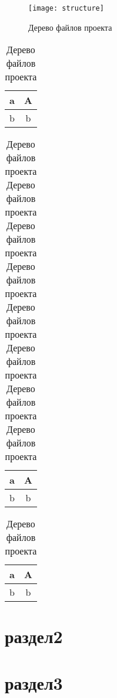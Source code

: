\begin{figure}
\centering
\texttt{[image: structure]}
\caption{Дерево файлов проекта}
\label{fig:structure2}
\end{figure}


\begin{table}
\caption{Дерево файлов проекта}
\label{tab:table1}
\centering
\begin{tabular}{|c|c|}
\hline
a & A\\
\hline
b & b\\
\hline
\end{tabular}
\end{table}

\begin{table}
\caption{Дерево файлов проекта Дерево файлов проекта Дерево файлов проекта Дерево файлов проекта Дерево файлов проекта Дерево файлов проекта Дерево файлов проекта Дерево файлов проекта }
\label{tab:table2}
\centering
\begin{tabular}{|c|c|}
\hline
a & A\\
\hline
b & b\\
\hline
\end{tabular}
\end{table}

\begin{table}
\caption{Дерево файлов проекта}
\label{tab:table3}
\centering
\begin{tabular}{|c|c|}
\hline
a & A\\
\hline
b & b\\
\hline
\end{tabular}
\end{table}

\lipsum[1]
\section{раздел2}
\section{раздел3}